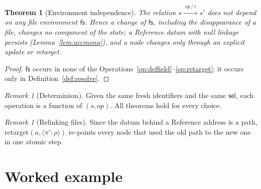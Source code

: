 \documentclass[11pt,a4paper]{article}
\theoremstyle{definition}
\theoremstyle{plain}
\newtheorem{theorem}[definition]{Theorem}
\theoremstyle{remark}
\newtheorem{remark}[definition]{Remark}
\newcommand{\tRef}{\rho}
\newcommand{\sel}{\mathsf{sel}}
\newcommand{\tr}[2]{\xrightarrow{\;#1\,/\,#2\;}}
\newcommand{\datum}[2]{\langle #1\!:\!#2\rangle}
\begin{document}
\begin{theorem}[Environment independence]\label{thm:env}
The relation $s\tr{\mathit{op}}{r}s'$ does not depend on any file environment $\mathsf{fs}$.
Hence a change of $\mathsf{fs}$, including the disappearance of a file, changes no component of the state; a Reference datum with null linkage persists
(Lemma~\ref{lem:accmono}), and a node changes only through an explicit \textsf{update} or \textsf{retarget}.
\end{theorem}
\begin{proof}
$\mathsf{fs}$ occurs in none of the Operations~\ref{op:deffield}--\ref{op:retarget}; it occurs only in Definition~\ref{def:resolve}.
\end{proof}

\begin{remark}[Determinism]
Given the same fresh identifiers and the same $\sel$, each operation is a function of $(s,\mathit{op})$. All theorems hold for every choice.
\end{remark}

\begin{remark}[Relinking files]
Since the datum behind a Reference address is a path, \textsf{retarget}$(a,\datum{\pi'}{\tRef})$ re-points every node that used the old path to the new one in one atomic step.
\end{remark}

\section{Worked example}
\label{sec:example}
\end{document}
